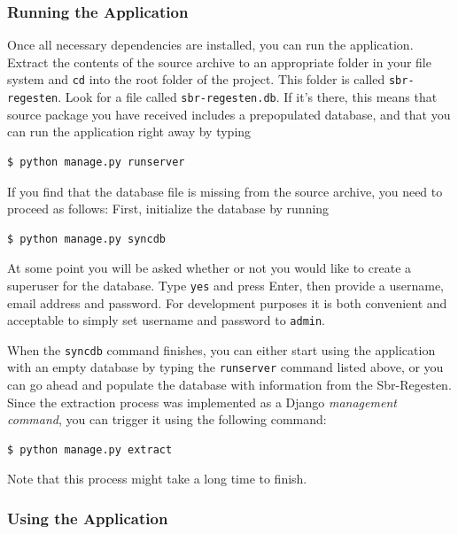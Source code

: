\subsubsection{Running the Application}
\label{sec:run}

Once all necessary dependencies are installed, you can run the
application. Extract the contents of the source archive to an
appropriate folder in your file system and \texttt{cd} into the root
folder of the project. This folder is called \texttt{sbr-regesten}.
Look for a file called \texttt{sbr-regesten.db}. If it's there, this
means that source package you have received includes a prepopulated
database, and that you can run the application right away by typing

\begin{verbatim}
$ python manage.py runserver
\end{verbatim}

If you find that the database file is missing from the source archive,
you need to proceed as follows: First, initialize the database by running

\begin{verbatim}
$ python manage.py syncdb
\end{verbatim}

At some point you will be asked whether or not you would like to
create a superuser for the database. Type \texttt{yes} and press
Enter, then provide a username, email address and password. For
development purposes it is both convenient and acceptable to simply
set username and password to \texttt{admin}.

When the \texttt{syncdb} command finishes, you can either start using
the application with an empty database by typing the
\texttt{runserver} command listed above, or you can go ahead and
populate the database with information from the Sbr-Regesten. Since
the extraction process was implemented as a Django \emph{management command},
you can trigger it using the following command:

\begin{verbatim}
$ python manage.py extract
\end{verbatim}

Note that this process might take a long time to finish.

\subsubsection{Using the Application}
\label{sec:use}

